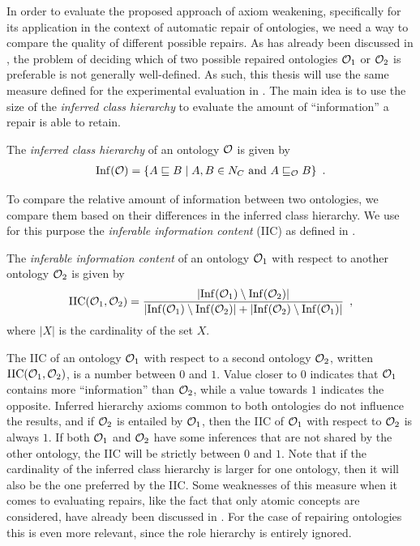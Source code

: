 
In order to evaluate the proposed approach of axiom weakening, specifically for its application in the context of automatic repair of ontologies, we need a way to compare the quality of different possible repairs. As has already been discussed in \cite{troquard2018repairing}, the problem of deciding which of two possible repaired ontologies $\mathcal{O}_1$ or $\mathcal{O}_2$ is preferable is not generally well-defined. As such, this thesis will use the same measure defined for the experimental evaluation in \cite{troquard2018repairing}. The main idea is to use the size of the \emph{inferred class hierarchy} to evaluate the amount of ``information'' a repair is able to retain.

\begin{definition}\label{def:inf}
  The \emph{inferred class hierarchy} of an ontology $\mathcal{O}$ is given by
  \begin{align*}
    {\ensuremath{\operatorname{Inf}}}(\mathcal{O}) = \{ A \sqsubseteq B \mid A, B \in N_C \text{ and } A \sqsubseteq_\mathcal{O} B \} \enspace.
  \end{align*}
\end{definition}

To compare the relative amount of information between two ontologies, we compare them based on their differences in the inferred class hierarchy. We use for this purpose the \emph{inferable information content} (IIC) as defined in \cite{troquard2018repairing}.

\begin{definition}\label{def:iic}
  The \emph{inferable information content} of an ontology $\mathcal{O}_1$ with respect to another ontology $\mathcal{O}_2$ is given by
  \begin{align*}
    {\ensuremath{\operatorname{IIC}}}(\mathcal{O}_1, \mathcal{O}_2) = \frac{| {\operatorname{Inf}}(\mathcal{O}_1) \setminus {\ensuremath{\operatorname{Inf}}}(\mathcal{O}_2) |}{|{\operatorname{Inf}}(\mathcal{O}_1) \setminus {\ensuremath{\operatorname{Inf}}}(\mathcal{O}_2)| + |{\operatorname{Inf}}(\mathcal{O}_2) \setminus {\ensuremath{\operatorname{Inf}}}(\mathcal{O}_1)|} \enspace,
  \end{align*}
  where $|X|$ is the cardinality of the set $X$.
\end{definition}

The IIC of an ontology $\mathcal{O}_1$ with respect to a second ontology $\mathcal{O}_2$, written ${\operatorname{IIC}}(\mathcal{O}_1, \mathcal{O}_2)$, is a number between $0$ and $1$. Value closer to $0$ indicates that $\mathcal{O}_1$ contains more ``information'' than $\mathcal{O}_2$, while a value towards $1$ indicates the opposite. Inferred hierarchy axioms common to both ontologies do not influence the results, and if $\mathcal{O}_2$ is entailed by $\mathcal{O}_1$, then the IIC of $\mathcal{O}_1$ with respect to $\mathcal{O}_2$ is always $1$. If both $\mathcal{O}_1$ and $\mathcal{O}_2$ have some inferences that are not shared by the other ontology, the IIC will be strictly between $0$ and $1$. Note that if the cardinality of the inferred class hierarchy is larger for one ontology, then it will also be the one preferred by the IIC. Some weaknesses of this measure when it comes to evaluating repairs, like the fact that only atomic concepts are considered, have already been discussed in \cite{troquard2018repairing}. For the case of repairing \SROIQ ontologies this is even more relevant, since the role hierarchy is entirely ignored.

